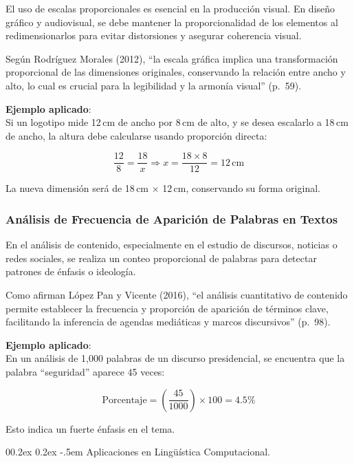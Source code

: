 \documentclass[
  stu,
  floatsintext,
  longtable,
  a4paper,
  nolmodern,
  notxfonts,
  notimes,
  colorlinks=true,linkcolor=blue,citecolor=blue,urlcolor=blue]{apa7}
\makeatletter
\renewcommand{\paragraph}{\@startsection{paragraph}{4}{\parindent}%
	{0\baselineskip \@plus 0.2ex \@minus 0.2ex}%
	{-.5em}%
	{\normalfont\normalsize\bfseries\typesectitle}}
\makeatother
\begin{document}
El uso de escalas proporcionales es esencial en la producción visual. En
diseño gráfico y audiovisual, se debe mantener la proporcionalidad de
los elementos al redimensionarlos para evitar distorsiones y asegurar
coherencia visual.

Según Rodríguez Morales (2012), ``la escala gráfica implica una
transformación proporcional de las dimensiones originales, conservando
la relación entre ancho y alto, lo cual es crucial para la legibilidad y
la armonía visual'' (p.~59).

\textbf{Ejemplo aplicado}:\\
Si un logotipo mide 12\,cm de ancho por 8\,cm de alto, y se desea
escalarlo a 18\,cm de ancho, la altura debe calcularse usando proporción
directa:

\[
\frac{12}{8} = \frac{18}{x} \Rightarrow x = \frac{18 \times 8}{12} = 12\,\text{cm}
\]

La nueva dimensión será de 18\,cm × 12\,cm, conservando su forma
original.

\subsubsection{Análisis de Frecuencia de Aparición de Palabras en
Textos}\label{anuxe1lisis-de-frecuencia-de-apariciuxf3n-de-palabras-en-textos}

En el análisis de contenido, especialmente en el estudio de discursos,
noticias o redes sociales, se realiza un conteo proporcional de palabras
para detectar patrones de énfasis o ideología.

Como afirman López Pan y Vicente (2016), ``el análisis cuantitativo de
contenido permite establecer la frecuencia y proporción de aparición de
términos clave, facilitando la inferencia de agendas mediáticas y marcos
discursivos'' (p.~98).

\textbf{Ejemplo aplicado}:\\
En un análisis de 1,000 palabras de un discurso presidencial, se
encuentra que la palabra ``seguridad'' aparece 45 veces:

\[
\text{Porcentaje} = \left( \frac{45}{1000} \right) \times 100 = 4.5\%
\]

Esto indica un fuerte énfasis en el tema.

\paragraph{Aplicaciones en Lingüística
Computacional.}\label{aplicaciones-en-linguxfcuxedstica-computacional}
\end{document}
